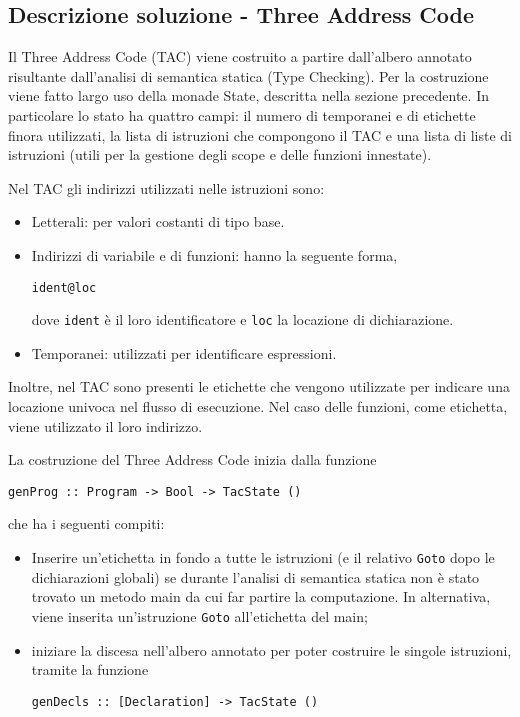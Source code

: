 \subsection{Descrizione soluzione - Three Address Code}

Il Three Address Code (TAC) viene costruito a partire dall'albero annotato risultante dall'analisi di semantica statica (Type Checking). Per la costruzione viene fatto largo uso della monade State, descritta nella sezione precedente. In particolare lo stato ha quattro campi: il numero di temporanei e di etichette finora utilizzati, la lista di istruzioni che compongono il TAC e una lista di liste di istruzioni (utili per la gestione degli scope e delle funzioni innestate).

Nel TAC gli indirizzi utilizzati nelle istruzioni sono:
\begin{itemize}
    \item Letterali: per valori costanti di tipo base.
    \item Indirizzi di variabile e di funzioni: hanno la seguente forma,
    \begin{center}
        {\tt ident@loc}
    \end{center}
    dove {\tt ident} è il loro identificatore e {\tt loc} la locazione di dichiarazione.
    \item Temporanei: utilizzati per identificare espressioni.
\end{itemize}
Inoltre, nel TAC sono presenti le etichette che vengono utilizzate per indicare una locazione univoca nel flusso di esecuzione. Nel caso delle funzioni, come etichetta, viene utilizzato il loro indirizzo.

La costruzione del Three Address Code inizia dalla funzione 
\begin{center}
    {\tt genProg :: Program -> Bool -> TacState ()} 
\end{center}

che ha i seguenti compiti:
\begin{itemize}
    \item Inserire un'etichetta in fondo a tutte le istruzioni (e il relativo {\tt Goto} dopo le dichiarazioni globali) se durante l'analisi di semantica statica non è stato trovato un metodo main da cui far partire la computazione. In alternativa, viene inserita un'istruzione {\tt Goto} all'etichetta del main;
    \item iniziare la discesa nell'albero annotato per poter costruire le singole istruzioni, tramite la funzione 
    \begin{center}
        {\tt genDecls :: [Declaration] -> TacState ()}
    \end{center} 
\end{itemize}

